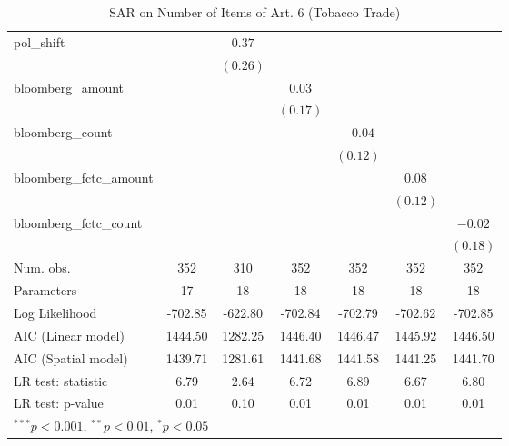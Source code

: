 \begin{table}[!h]
\begin{center}
\begin{tabular}{l c c c c c c }
pol\_shift              &              & $0.37$       &              &              &              &              \\
                        &              & $(0.26)$     &              &              &              &              \\
bloomberg\_amount       &              &              & $0.03$       &              &              &              \\
                        &              &              & $(0.17)$     &              &              &              \\
bloomberg\_count        &              &              &              & $-0.04$      &              &              \\
                        &              &              &              & $(0.12)$     &              &              \\
bloomberg\_fctc\_amount &              &              &              &              & $0.08$       &              \\
                        &              &              &              &              & $(0.12)$     &              \\
bloomberg\_fctc\_count  &              &              &              &              &              & $-0.02$      \\
                        &              &              &              &              &              & $(0.18)$     \\
\midrule
Num. obs.               & 352          & 310          & 352          & 352          & 352          & 352          \\
Parameters              & 17           & 18           & 18           & 18           & 18           & 18           \\
Log Likelihood          & -702.85      & -622.80      & -702.84      & -702.79      & -702.62      & -702.85      \\
AIC (Linear model)      & 1444.50      & 1282.25      & 1446.40      & 1446.47      & 1445.92      & 1446.50      \\
AIC (Spatial model)     & 1439.71      & 1281.61      & 1441.68      & 1441.58      & 1441.25      & 1441.70      \\
LR test: statistic      & 6.79         & 2.64         & 6.72         & 6.89         & 6.67         & 6.80         \\
LR test: p-value        & 0.01         & 0.10         & 0.01         & 0.01         & 0.01         & 0.01         \\
\bottomrule
\multicolumn{7}{l}{\scriptsize{$^{***}p<0.001$, $^{**}p<0.01$, $^*p<0.05$}}
\end{tabular}
\caption{SAR on Number of Items of Art. 6 (Tobacco Trade)}
\label{table:coefficients}
\end{center}
\end{table}
